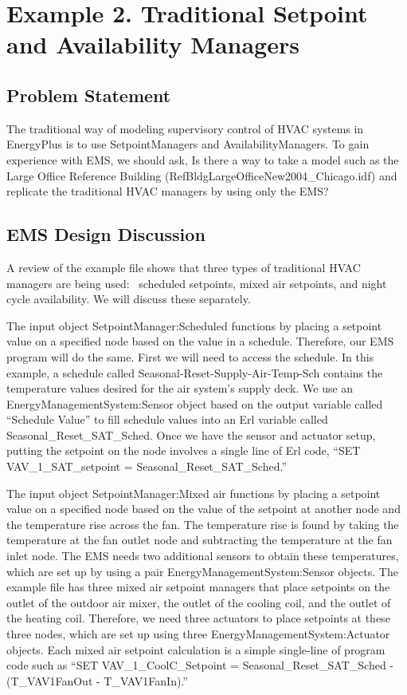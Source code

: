 \section{Example 2. Traditional Setpoint and Availability Managers}\label{example-2.-traditional-setpoint-and-availability-managers}

\subsection{Problem Statement}\label{problem-statement-004}

The traditional way of modeling supervisory control of HVAC systems in EnergyPlus is to use SetpointManagers and AvailabilityManagers. To gain experience with EMS, we should ask, Is there a way to take a model such as the Large Office Reference Building (RefBldgLargeOfficeNew2004\_Chicago.idf) and replicate the traditional HVAC managers by using only the EMS?

\subsection{EMS Design Discussion}\label{ems-design-discussion-004}

A review of the example file shows that three types of traditional HVAC managers are being used:~ scheduled setpoints, mixed air setpoints, and night cycle availability. We will discuss these separately.

The input object SetpointManager:Scheduled functions by placing a setpoint value on a specified node based on the value in a schedule. Therefore, our EMS program will do the same. First we will need to access the schedule. In this example, a schedule called Seasonal-Reset-Supply-Air-Temp-Sch contains the temperature values desired for the air system's supply deck. We use an EnergyManagementSystem:Sensor object based on the output variable called ``Schedule Value'' to fill schedule values into an Erl variable called Seasonal\_Reset\_SAT\_Sched. Once we have the sensor and actuator setup, putting the setpoint on the node involves a single line of Erl code, ``SET VAV\_1\_SAT\_setpoint = Seasonal\_Reset\_SAT\_Sched.''

The input object SetpointManager:Mixed air functions by placing a setpoint value on a specified node based on the value of the setpoint at another node and the temperature rise across the fan. The temperature rise is found by taking the temperature at the fan outlet node and subtracting the temperature at the fan inlet node. The EMS needs two additional sensors to obtain these temperatures, which are set up by using a pair EnergyManagementSystem:Sensor objects. The example file has three mixed air setpoint managers that place setpoints on the outlet of the outdoor air mixer, the outlet of the cooling coil, and the outlet of the heating coil. Therefore, we need three actuators to place setpoints at these three nodes, which are set up using three EnergyManagementSystem:Actuator objects. Each mixed air setpoint calculation is a simple single-line of program code such as ``SET VAV\_1\_CoolC\_Setpoint = Seasonal\_Reset\_SAT\_Sched - (T\_VAV1FanOut - T\_VAV1FanIn).''

